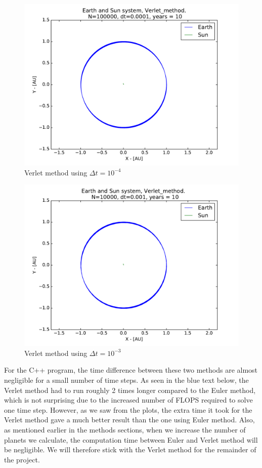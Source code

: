 \documentclass[12pt]{article}
\begin{document}
\begin{figure}[!h]
\centering
\includegraphics[width=\linewidth]{Plots/Earth_Sun_Verlet_method.pdf}
\caption{Verlet method using $\Delta t = 10^{-4}$}
\label{fig:balle2}
\end{figure}
\begin{figure}[!h]
\centering
\includegraphics[width=\linewidth]{Plots/Earth_Sun_Verlet_method_larger_dt.pdf}
\caption{Verlet method using $\Delta t = 10^{-3}$}
\label{fig:balle3}
\end{figure}

For the C++ program, the time difference between these two methods are almost negligible for a small number of time steps. As seen in the blue text below, the Verlet method had to run roughly 2 times longer compared to the Euler method, which is not surprising due to the increased number of FLOPS required to solve one time step. However, as we saw from the plots, the extra time it took for the Verlet method gave a much better result than the one using Euler method. Also, as mentioned earlier in the methods sections, when we increase the number of planets we calculate, the computation time between Euler and Verlet method will be negligible. We will therefore stick with the Verlet method for the remainder of the project. 
\end{document}
